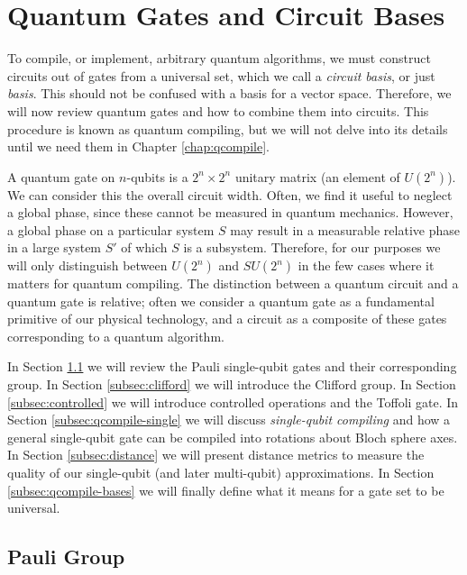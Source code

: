 \section{Quantum Gates and Circuit Bases}
\label{sec:intro-basis}

To compile, or implement, arbitrary quantum algorithms, we must construct circuits
out of gates from a universal set, which we call a \emph{circuit basis},
or just \emph{basis}.
This should not be confused with a basis for a vector space.
Therefore, we will now review quantum gates and how to combine them into
circuits. This procedure is known as quantum compiling, but we will not
delve into its details until we need them in Chapter \ref{chap:qcompile}.

A quantum gate on $n$-qubits is a $2^n \times 2^n$ unitary matrix
(an element of $U(2^n)$). We can consider this the overall circuit width.
Often, we find it useful to neglect a
global phase, since these cannot be measured in quantum mechanics.
However, a global
phase on a particular system $S$ may result in a measurable relative phase
in a large system $S'$ of which $S$ is a subsystem. Therefore, for our
purposes we will only distinguish between $U(2^n)$ and
$SU(2^n)$ in the few cases where it matters for
quantum compiling. The distinction between a quantum circuit
and a quantum gate is relative; often we consider a quantum gate as a
fundamental primitive of our physical technology, and a circuit as a
composite of these gates corresponding to a quantum algorithm.

In Section \ref{subsec:pauli} we
will review the Pauli single-qubit gates and their corresponding group.
In Section \ref{subsec:clifford} we will introduce the Clifford group.
In Section \ref{subsec:controlled} we will introduce controlled operations
and the Toffoli gate.
In Section \ref{subsec:qcompile-single} we will discuss \emph{single-qubit compiling}
and how a
general single-qubit gate can be compiled into rotations about Bloch sphere axes.
In Section \ref{subsec:distance} we will present distance metrics to
measure the quality of our single-qubit (and later multi-qubit) approximations.
In Section \ref{subsec:qcompile-bases} we will finally
define what it means for a gate set to be universal.

\subsection{Pauli Group}
\label{subsec:pauli}


